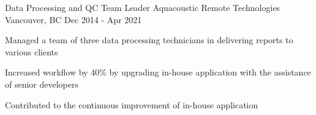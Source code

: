\begin{cventries}
  \cventry
    {Data Processing and QC Team Leader} %
    {Aquacoustic Remote Technologies} %
    {Vancouver, BC} %
    {Dec 2014 - Apr 2021} %
    {
      \begin{cvitems} %
        \item{Managed a team of three data processing technicians in delivering reports to various clients}
        \item{Increased workflow by 40\% by upgrading in-house application with the assistance of senior developers}
        \item{Contributed to the continuous improvement of in-house application}
      \end{cvitems}
    }

\end{cventries}
